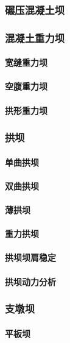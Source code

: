 \documentclass[UTF8]{../../ApplicationUniverse}
\begin{document}
        \subsubsection{碾压混凝土坝}
        \subsubsection{混凝土重力坝}
            \paragraph{宽缝重力坝}
            \paragraph{空腹重力坝}
            \paragraph{拱形重力坝}
        \subsubsection{拱坝}
            \paragraph{单曲拱坝}
            \paragraph{双曲拱坝}
            \paragraph{薄拱坝}
            \paragraph{重力拱坝}
            \paragraph{拱坝坝肩稳定}
            \paragraph{拱坝动力分析}
        \subsubsection{支墩坝}
            \paragraph{平板坝}
\end{document}
